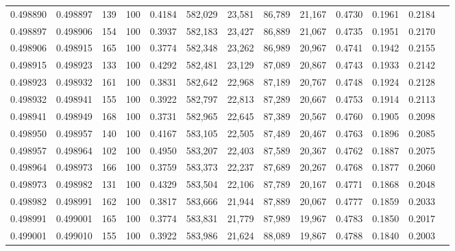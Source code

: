 \begin{tabular}{rrrrrrrrrrrrr}
0.498890 & 0.498897 &   139 & 100 &                                     0.4184 & 582,029 &  23,581 &  86,789 &  21,167 & 0.4730 & 0.1961 & 0.2184 \\
0.498897 & 0.498906 &   154 & 100 &                                     0.3937 & 582,183 &  23,427 &  86,889 &  21,067 & 0.4735 & 0.1951 & 0.2170 \\
0.498906 & 0.498915 &   165 & 100 &                                     0.3774 & 582,348 &  23,262 &  86,989 &  20,967 & 0.4741 & 0.1942 & 0.2155 \\
0.498915 & 0.498923 &   133 & 100 &                                     0.4292 & 582,481 &  23,129 &  87,089 &  20,867 & 0.4743 & 0.1933 & 0.2142 \\
0.498923 & 0.498932 &   161 & 100 &                                     0.3831 & 582,642 &  22,968 &  87,189 &  20,767 & 0.4748 & 0.1924 & 0.2128 \\
0.498932 & 0.498941 &   155 & 100 &                                     0.3922 & 582,797 &  22,813 &  87,289 &  20,667 & 0.4753 & 0.1914 & 0.2113 \\
0.498941 & 0.498949 &   168 & 100 &                                     0.3731 & 582,965 &  22,645 &  87,389 &  20,567 & 0.4760 & 0.1905 & 0.2098 \\
0.498950 & 0.498957 &   140 & 100 &                                     0.4167 & 583,105 &  22,505 &  87,489 &  20,467 & 0.4763 & 0.1896 & 0.2085 \\
0.498957 & 0.498964 &   102 & 100 &                                     0.4950 & 583,207 &  22,403 &  87,589 &  20,367 & 0.4762 & 0.1887 & 0.2075 \\
0.498964 & 0.498973 &   166 & 100 &                                     0.3759 & 583,373 &  22,237 &  87,689 &  20,267 & 0.4768 & 0.1877 & 0.2060 \\
0.498973 & 0.498982 &   131 & 100 &                                     0.4329 & 583,504 &  22,106 &  87,789 &  20,167 & 0.4771 & 0.1868 & 0.2048 \\
0.498982 & 0.498991 &   162 & 100 &                                     0.3817 & 583,666 &  21,944 &  87,889 &  20,067 & 0.4777 & 0.1859 & 0.2033 \\
0.498991 & 0.499001 &   165 & 100 &                                     0.3774 & 583,831 &  21,779 &  87,989 &  19,967 & 0.4783 & 0.1850 & 0.2017 \\
0.499001 & 0.499010 &   155 & 100 &                                     0.3922 & 583,986 &  21,624 &  88,089 &  19,867 & 0.4788 & 0.1840 & 0.2003 \\

\end{tabular}
